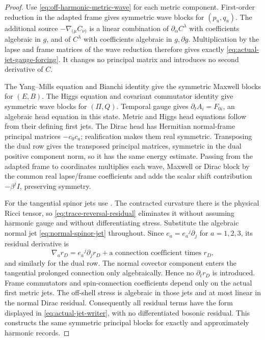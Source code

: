 \documentclass[11pt]{article}
\numberwithin{equation}{section}
\theoremstyle{definition}
\theoremstyle{remark}
\begin{document}
\begin{proof}
Use \eqref{eq:off-harmonic-metric-wave} for each metric component. First-order
reduction in the adapted frame gives symmetric wave blocks for $(p_u,q_u)$.
The additional source $-\nabla_{(\mu}C_{\nu)}$ is a linear combination of
$\partial_\alpha C^\lambda$ with coefficients algebraic in $g$, and of
$C^\lambda$ with coefficients algebraic in $g,\partial g$. Multiplication by
the lapse and frame matrices of the wave reduction therefore gives exactly
\eqref{eq:actual-jet-gauge-forcing}. It changes no principal matrix and
introduces no second derivative of $C$.

The Yang--Mills equation and Bianchi identity give the symmetric Maxwell
blocks for $(E,B)$. The Higgs equation and covariant commutator identity give
symmetric wave blocks for $(\Pi,Q)$. Temporal gauge gives
$\partial_tA_i=F_{0i}$, an algebraic head equation in this state. Metric and
Higgs head equations follow from their defining first jets. The Dirac head
has Hermitian normal-frame principal matrices $-c_0c_a$; realification makes
them real symmetric. Transposing the dual row gives the transposed principal
matrices, symmetric in the dual positive component norm, so it has the same
energy estimate. Passing from the adapted frame to coordinates multiplies
each wave, Maxwell or Dirac block by the common real lapse/frame coefficients
and adds the scalar shift contribution $-\beta^jI$, preserving symmetry.

For the tangential spinor jets use .
The contracted curvature there is the physical Ricci tensor, so
\eqref{eq:trace-reversal-residual} eliminates it without assuming harmonic
gauge and without differentiating stress. Substitute the algebraic normal
jet \eqref{eq:normal-spinor-jet} throughout. Since $e_a=e_a{}^j\partial_j$
for $a=1,2,3$, its residual derivative is
\[
 \nabla_a r_D=e_a{}^j\partial_j r_D+\text{a connection coefficient times }r_D,
\]
and similarly for the dual row. The normal covector component enters the
tangential prolonged connection only algebraically. Hence no
$\partial_t r_D$ is introduced. Frame commutators and spin-connection
coefficients depend only on the actual first metric jets. The off-shell
stress is algebraic in those jets and at most linear in the normal Dirac
residual. Consequently all residual terms have the form displayed in
\eqref{eq:actual-jet-writer}, with no differentiated bosonic residual.
This constructs the same symmetric principal blocks for exactly and
approximately harmonic records.
\end{proof}
\end{document}
